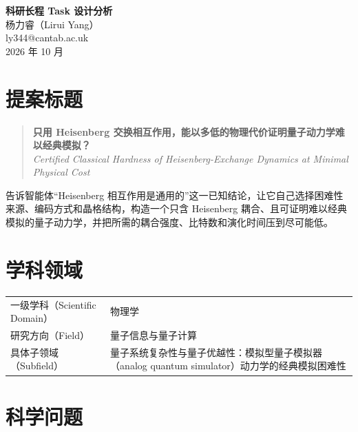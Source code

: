 \documentclass[11pt,a4paper,fontset=none]{ctexart}
\begin{document}
\begin{center}
  {\bfseries\Large 科研长程 Task 设计分析}\\[0.8em]
  杨力睿（Lirui Yang）\\[0.3em]
  {\small ly344@cantab.ac.uk}\\[0.2em]
  {\small 2026 年 10 月}
\end{center}
\vspace{0.4em}

\section{提案标题}

\begin{quote}
{\bfseries 只用 Heisenberg 交换相互作用，能以多低的物理代价证明量子动力学难以经典模拟？}\\[0.3em]
\textit{Certified Classical Hardness of Heisenberg-Exchange Dynamics at Minimal Physical Cost}
\end{quote}

\noindent 告诉智能体“Heisenberg 相互作用是通用的”这一已知结论，让它自己选择困难性来源、编码方式和晶格结构，构造一个只含 Heisenberg 耦合、且可证明难以经典模拟的量子动力学，并把所需的耦合强度、比特数和演化时间压到尽可能低。

\section{学科领域}

\begin{center}
\begin{tabular}{@{}lp{}@{}}
\toprule
一级学科（Scientific Domain） & 物理学 \\
研究方向（Field） & 量子信息与量子计算 \\
具体子领域（Subfield） & 量子系统复杂性与量子优越性：模拟型量子模拟器（analog quantum simulator）动力学的经典模拟困难性 \\
\bottomrule
\end{tabular}
\end{center}

\section{科学问题}
\end{document}
